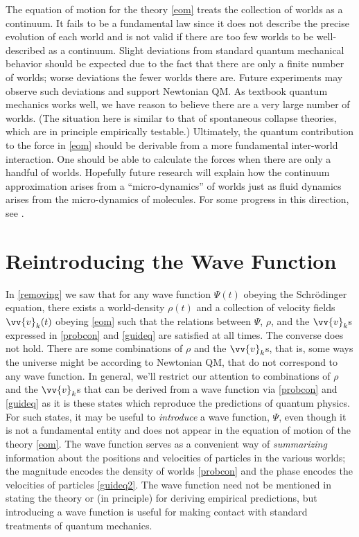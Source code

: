 \documentclass[onecolumn,secnumarabic,balancelastpage,amsmath,amssymb,nofootinbib]{article}
\begin{document}
The equation of motion for the theory \eqref{eom} treats the collection of worlds as a continuum.  It fails to be a fundamental law since it does not describe the precise evolution of each world and is not valid if there are too few worlds to be well-described as a continuum.  Slight deviations from standard quantum mechanical behavior should be expected due to the fact that there are only a finite number of worlds; worse deviations the fewer worlds there are.  Future experiments may observe such deviations and support Newtonian QM.  As textbook quantum mechanics works well, we have reason to believe there are a very large number of worlds.  (The situation here is similar to that of spontaneous collapse theories, which are in principle empirically testable.)  Ultimately, the quantum contribution to the force in \eqref{eom} should be derivable from a more fundamental inter-world interaction.  One should be able to calculate the forces when there are only a handful of worlds.  Hopefully future research will explain how the continuum approximation arises from a ``micro-dynamics'' of worlds just as fluid dynamics arises from the micro-dynamics of molecules.  For some progress in this direction, see \citet{HDW}.

\section{Reintroducing the Wave Function}\label{defining}

In \textsection \ref{removing} we saw that for any wave function $\Psi(t)$ obeying the Schr\"{o}dinger equation, there exists a world-density $\rho(t)$ and a collection of velocity fields $\vv{v}_k(t)$ obeying \eqref{eom} such that the relations between $\Psi$, $\rho$, and the $\vv{v}_k$s expressed in \eqref{probcon} and \eqref{guideq} are satisfied at all times.  The converse does not hold.  There are some combinations of $\rho$ and the $\vv{v}_k$s, that is, some ways the universe might be according to Newtonian QM, that do not correspond to any wave function.  In general, we'll restrict our attention to combinations of $\rho$ and the $\vv{v}_k$s that can be derived from a wave function via \eqref{probcon} and \eqref{guideq} as it is these states which reproduce the predictions of quantum physics.  For such states, it may be useful to \emph{introduce} a wave function, $\Psi$, even though it is not a fundamental entity and does not appear in the equation of motion of the theory \eqref{eom}.  The wave function serves as a convenient way of \emph{summarizing} information about the positions and velocities of particles in the various worlds; the magnitude encodes the density of worlds \eqref{probcon} and the phase encodes the velocities of particles \eqref{guideq2}.  The wave function need not be mentioned in stating the theory or (in principle) for deriving empirical predictions, but introducing a wave function is useful for making contact with standard treatments of quantum mechanics.
\end{document}
